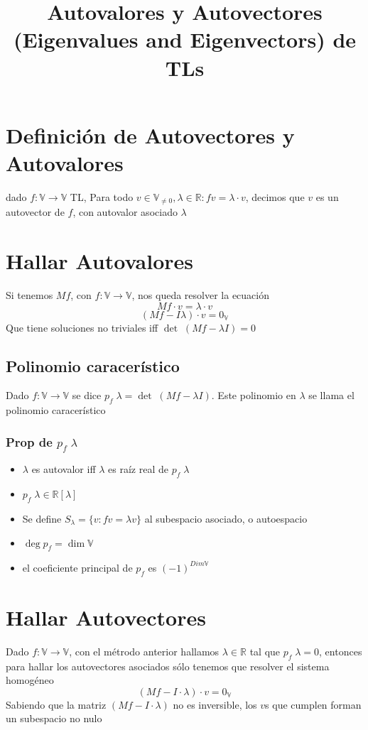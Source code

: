 \documentclass{article}
\title{Autovalores y Autovectores (Eigenvalues and Eigenvectors) de TLs}
\date{}
\author{}
\def\R{\mathbb{R}}
\def\V{\mathbb{V}}
\begin{document}
\maketitle
\section{Definición de Autovectores y Autovalores}
dado \(
	f : \V \to \V
\) TL, Para todo \(
v \in \V_{\neq 0}, \lambda \in \R : fv = \lambda \cdot v
\), decimos que $v$ es un autovector de $f$, con autovalor asociado
$\lambda$

\section{Hallar Autovalores}
Si tenemos $Mf$, con $f : \V \to \V$, nos queda resolver la ecuación
\[
	Mf\cdot v = \lambda \cdot v
\]
\[
	(Mf - I\lambda)\cdot v = 0_\V
\]
Que tiene soluciones no triviales iff $\det \;(Mf - \lambda I) = 0$
\subsection{Polinomio caracerístico}
Dado $f : \V \to \V$
se dice $p_f \; \lambda = \det \; (Mf - \lambda I)$.
Este polinomio en $\lambda$ se llama el polinomio caracerístico

\subsubsection{Prop de $p_f\; \lambda$}
\begin{itemize}
	\item $\lambda$ es autovalor iff $\lambda$ es raíz real de $p_f \; \lambda$
	\item $p_f \; \lambda \in \R[\lambda]$
	\item Se define $S_\lambda = \{v : fv = \lambda v\}$ al subespacio
		asociado, o autoespacio
	\item $\deg p_f = \dim \V$
	\item el coeficiente principal de $p_f$ es $(-1)^{Dim \V}$
\end{itemize}

\section{Hallar Autovectores}
Dado $f : \V \to \V$,
con el métrodo anterior hallamos $\lambda \in \R$ tal que $p_f \; \lambda = 0$,
entonces para hallar los autovectores asociados sólo tenemos que resolver el
sistema homogéneo \[
	(Mf - I\cdot \lambda)\cdot v = 0_\V
\]
Sabiendo que la matriz $(Mf - I\cdot \lambda)$ no es inversible, los $v$s
que cumplen forman un subespacio no nulo
\end{document}

